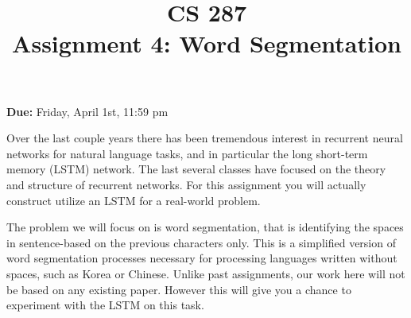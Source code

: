 \documentclass[11pt]{article}
\title{CS 287 \\ Assignment 4: Word Segmentation}
\date{}
\begin{document}
\maketitle{}

\begin{center}
  \textbf{Due:} Friday, April 1st, 11:59 pm 
\end{center}


Over the last couple years there has been tremendous interest in
recurrent neural networks for natural language tasks, and in
particular the long short-term memory (LSTM) network. The last 
several classes have focused on the theory and structure of 
recurrent networks. For this assignment you will actually 
construct utilize an LSTM for a real-world problem. 

The problem we will focus on is word segmentation, that is identifying
the spaces in sentence-based on the previous characters only.  This is
a simplified version of word segmentation processes necessary for
processing languages written without spaces, such as Korea or Chinese.
Unlike past assignments, our work here will not be based on any
existing paper. However this will give you a chance 
to experiment with the LSTM on this task. 




\end{document}

